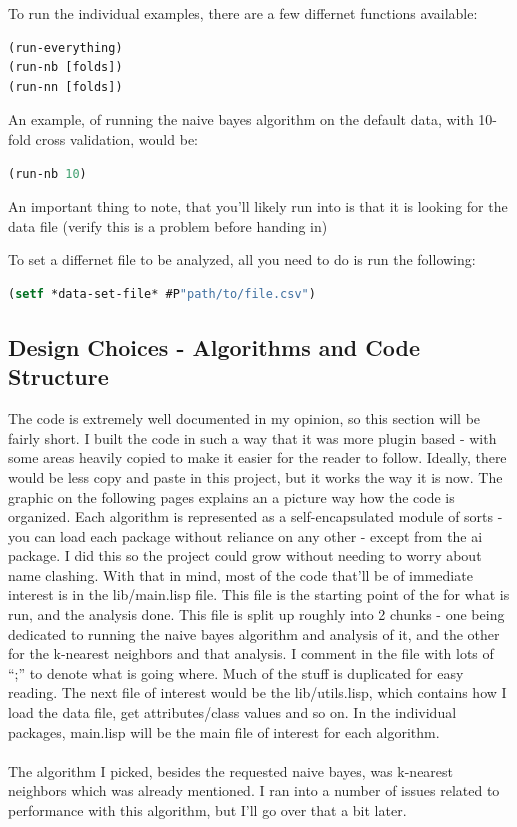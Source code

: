 \documentclass{article}
\begin{document}
To run the individual examples, there are a few differnet functions available:
\begin{lstlisting}[frame=single,language=lisp]
(run-everything)
(run-nb [folds])
(run-nn [folds])
\end{lstlisting}

An example, of running the naive bayes algorithm on the default data, with 10-fold cross validation, would be:
\begin{lstlisting}[frame=single,language=lisp]
(run-nb 10)
\end{lstlisting}

An important thing to note, that you'll likely run into is that it is looking for the data file (verify this is a problem before handing in)

To set a differnet file to be analyzed, all you need to do is run the following:
\begin{lstlisting}[frame=single,language=lisp]
(setf *data-set-file* #P"path/to/file.csv")
\end{lstlisting}

\subsection{Design Choices - Algorithms and Code Structure}
The code is extremely well documented in my  opinion, so this section will be fairly short.  I built the code in such a way that it was more plugin based - with some areas heavily copied to make it easier for the reader to follow.  Ideally, there would be less copy and paste in this project, but it works the way it is now.  The graphic on the following pages explains an a picture way how the code is organized.  Each algorithm is represented as a self-encapsulated module of sorts - you can load each package without reliance on any other - except from the ai package.  I did this so the project could grow without needing to worry about name clashing.  With that in mind, most of the code that'll be of immediate interest is in the lib/main.lisp file.  This file is the starting point of the for what is run, and the analysis done.  This file is split up roughly into 2 chunks - one being dedicated to running the naive bayes algorithm and analysis of it, and the other for the k-nearest neighbors and that analysis.  I comment in the file with lots of ``;'' to denote what is going where.  Much of the stuff is duplicated for easy reading.  The next file of interest would be the lib/utils.lisp, which contains how I load the data file, get attributes/class values and so on.  In the individual packages, main.lisp will be the main file of interest for each algorithm.\\
\\
The algorithm I picked, besides the requested naive bayes, was k-nearest neighbors which was already mentioned.  I ran into a number of issues related to performance with this algorithm, but I'll go over that a bit later.
\end{document}
